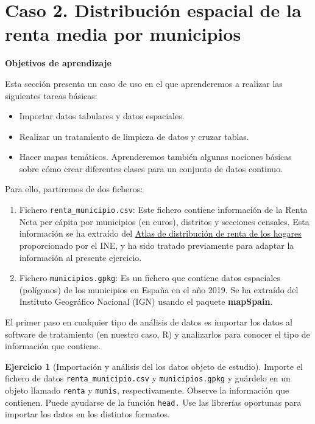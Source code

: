 \documentclass[
]{report}
\theoremstyle{definition}
\theoremstyle{definition}
\theoremstyle{definition}
\newtheorem{exercise}{Ejercicio}[chapter]
\theoremstyle{definition}
\theoremstyle{remark}
\begin{document}
\hypertarget{caso-2.-distribuciuxf3n-espacial-de-la-renta-media-por-municipios}{%
\section{Caso 2. Distribución espacial de la renta media por municipios}\label{caso-2.-distribuciuxf3n-espacial-de-la-renta-media-por-municipios}}

\textbf{Objetivos de aprendizaje}

Esta sección presenta un caso de uso en el que aprenderemos a realizar las
siguientes tareas básicas:

\begin{itemize}
\item
  Importar datos tabulares y datos espaciales.
\item
  Realizar un tratamiento de limpieza de datos y cruzar tablas.
\item
  Hacer mapas temáticos. Aprenderemos también algunas nociones básicas sobre
  cómo crear diferentes clases para un conjunto de datos continuo.
\end{itemize}

Para ello, partiremos de dos ficheros:

\begin{enumerate}
\def\labelenumi{\arabic{enumi}.}
\item
  Fichero \texttt{renta\_municipio.csv}: Este fichero contiene información de la Renta
  Neta per cápita por municipios (en euros), distritos y secciones censales.
  Esta información se ha extraído del \href{https://www.ine.es/experimental/atlas/experimental_atlas.htm}{Atlas de distribución de renta de los
  hogares}
  proporcionado por el INE, y ha sido tratado previamente para adaptar la
  información al presente ejercicio.
\item
  Fichero \texttt{municipios.gpkg}: Es un fichero que contiene datos espaciales
  (polígonos) de los municipios en España en el año 2019. Se ha extraído del
  Instituto Geográfico Nacional (IGN) usando el paquete \textbf{mapSpain}.
\end{enumerate}

El primer paso en cualquier tipo de análisis de datos es importar los datos al
software de tratamiento (en nuestro caso, R) y analizarlos para conocer el tipo
de información que contiene.

\begin{exercise}[Importación y análisis del los datos objeto de estudio]
\protect\hypertarget{exr:ex16}{}\label{exr:ex16}Importe el fichero de datos \texttt{renta\_municipio.csv} y \texttt{municipios.gpkg} y guárdelo
en un objeto llamado \texttt{renta} y \texttt{munis}, respectivamente. Observe la información
que contienen. Puede ayudarse de la función \texttt{head.} Use las librerías oportunas
para importar los datos en los distintos formatos.
\end{exercise}
\end{document}
